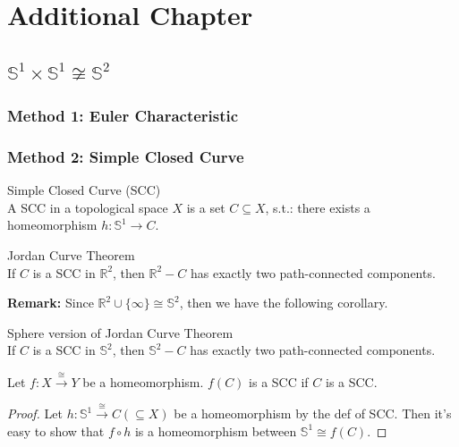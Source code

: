 \chapter{Additional Chapter}

\section{$\mathbb{S}^1 \times \mathbb{S}^1 \not\cong \mathbb{S}^2$}

\subsection{Method 1: Euler Characteristic}

\subsection{Method 2: Simple Closed Curve}

\begin{definition}{Simple Closed Curve (SCC)}\\
A SCC in a topological space $X$ is a set $C \subseteq X$, s.t.: there exists a homeomorphism $h: \mathbb{S}^1 \rightarrow C$.
\end{definition}

\begin{theorem}{Jordan Curve Theorem}\\
If $C$ is a SCC in $\mathbb{R}^2$, then $\mathbb{R}^2 - C$ has exactly two path-connected components.
\end{theorem}

\noindent\textbf{Remark:} Since $\mathbb{R}^2 \cup \{ \infty \}\cong \mathbb{S}^2$, then we have the following corollary.

\begin{corollary}{Sphere version of Jordan Curve Theorem}\\
If $C$ is a SCC in $\mathbb{S}^2$, then $\mathbb{S}^2 - C$ has exactly two path-connected components.
\end{corollary}

\begin{proposition}
    Let $f: X \overset{\cong}{\rightarrow} Y$ be a homeomorphism. $f(C)$ is a SCC if $C$ is a SCC.
\end{proposition}

\begin{proof}
    Let $h: \mathbb{S}^1 \overset{\cong}{\rightarrow} C (\subseteq X)$ be a homeomorphism by the def of SCC. Then it's easy to show that $f \circ h$ is a homeomorphism between $\mathbb{S}^1 \cong f(C)$.
\end{proof}

